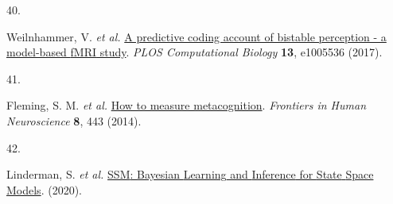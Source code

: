 \documentclass[
]{article}
\newlength{\cslhangindent}
\newlength{\csllabelwidth}
\newenvironment{CSLReferences}[2] %
 {\begin{list}{}{%
  \setlength{\itemindent}{0pt}
  \setlength{\leftmargin}{0pt}
  \setlength{\parsep}{0pt}
  \ifodd #1
   \setlength{\leftmargin}{\cslhangindent}
   \setlength{\itemindent}{-1\cslhangindent}
  \fi
  \setlength{\itemsep}{#2\baselineskip}}}
 {\end{list}}
\newcommand{\CSLLeftMargin}[1]{\parbox[t]{\csllabelwidth}{\strut#1\strut}}
\newcommand{\CSLRightInline}[1]{\parbox[t]{\linewidth - \csllabelwidth}{\strut#1\strut}}
\begin{document}
\begin{CSLReferences}{0}{0}
\CSLLeftMargin{40. }%
\CSLRightInline{Weilnhammer, V. \emph{et al.}
\href{https://doi.org/10.1371/journal.pcbi.1005536}{A predictive coding
account of bistable perception - a model-based {fMRI} study}. \emph{PLOS
Computational Biology} \textbf{13}, e1005536 (2017).}

\CSLLeftMargin{41. }%
\CSLRightInline{Fleming, S. M. \emph{et al.}
\href{https://doi.org/10.3389/fnhum.2014.00443}{How to measure
metacognition}. \emph{Frontiers in Human Neuroscience} \textbf{8}, 443
(2014).}

\CSLLeftMargin{42. }%
\CSLRightInline{Linderman, S. \emph{et al.}
\href{https://github.com/lindermanlab/ssm}{{SSM}: {Bayesian} {Learning}
and {Inference} for {State} {Space} {Models}}. (2020).}

\end{CSLReferences}
\end{document}
